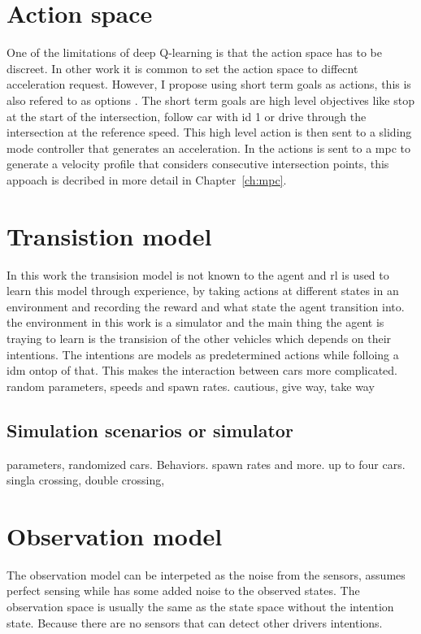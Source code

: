 \section{Action space}
One of the limitations of deep Q-learning is that the action space has to be discreet. In other work it is common to set the action space to diffecnt acceleration request. However, I propose using short term goals as actions, this is also refered to as options \cite{options}. The short term goals are high level objectives like stop at the start of the intersection, follow car with id 1 or drive through the intersection at the reference speed. 
This high level action is then sent to a sliding mode controller that generates an acceleration. 
In \paperMPC the actions is sent to a \gls{mpc} to generate a velocity profile that considers consecutive intersection points, this appoach is decribed in more detail in Chapter~\ref{ch:mpc}.  

\section{Transistion model}
In this work the transision model is not known to the agent and \gls{rl} is used to learn this model through experience, by taking actions at different states in an environment and recording the reward and what state the agent transition into.
the environment in this work is a simulator and the main thing the agent is traying to learn is the transision of the other vehicles which depends on their intentions. 
The intentions are models as predetermined actions while folloing a \gls{idm} ontop of that. This makes the interaction between cars more complicated. 
\paperLSTM random parameters, speeds and spawn rates. 
\paperMPC cautious, give way, take way


\subsection{Simulation scenarios or simulator}
parameters, randomized cars. Behaviors. spawn rates and more. up to four cars. 
singla crossing, double crossing, 

\section{Observation model}
The observation model can be interpeted as the noise from the sensors, \paperLSTM assumes perfect sensing while \paperBelief has some added noise to the observed states. 
The observation space is usually the same as the state space without the intention state. Because there are no sensors that can detect other drivers intentions. 

